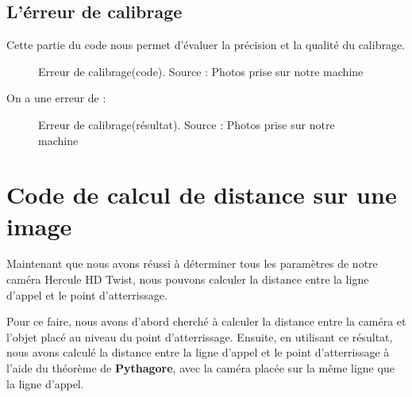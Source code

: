 \subsection{L'érreur de calibrage}

Cette partie du code nous permet d'évaluer la précision et la qualité du calibrage.

\begin{figure}[H]%
	\center%
	\setlength{\fboxsep}{5pt}%
	\setlength{\fboxrule}{0.5pt}%
	\caption[Erreur de calibrage(code)]{Erreur de calibrage(code). Source : Photos prise sur notre machine}
	\label{fig:Erreur de calibrage(code)}
\end{figure}

 
On a une erreur de :


\begin{figure}[H]%
	\center%
	\setlength{\fboxsep}{5pt}%
	\setlength{\fboxrule}{0.5pt}%
	\caption[ Erreur de calibrage(résultat)]{Erreur de calibrage(résultat). Source : Photos prise sur notre machine}
	\label{fig:Erreur de calibrage(résultat)}
\end{figure}






\newpage
\section{Code de calcul de distance sur une image}
 
 Maintenant que nous avons réussi à déterminer tous les paramètres de notre caméra Hercule HD Twist, nous pouvons calculer la distance entre la ligne d'appel et le point d'atterrissage.
 
 Pour ce faire, nous avons d'abord cherché à calculer la distance entre la caméra et l'objet placé au niveau du point d'atterrissage. Ensuite, en utilisant ce résultat, nous avons calculé la distance entre la ligne d'appel et le point d'atterrissage à l'aide du théorème de \textbf{Pythagore}, avec la caméra placée sur la même ligne que la ligne d'appel.
 

